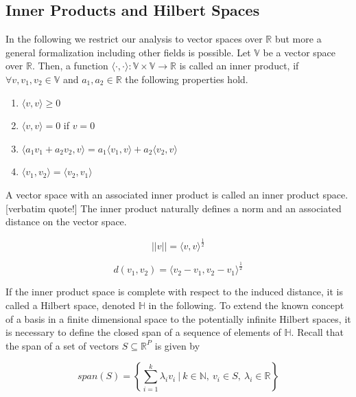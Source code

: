 \documentclass[11pt,twoside,a4paper]{article}
\begin{document}
	\subsection{Inner Products and Hilbert Spaces}
	In the following we restrict our analysis to vector spaces over $\mathbb{R}$ but more a general formalization including other fields is possible. Let $\mathbb{V}$ be a vector space over $\mathbb{R}$.  Then, a function $\langle \cdot, \cdot \rangle : \mathbb{V} \times  \mathbb{V} \rightarrow \mathbb{R}$ is called an inner product, if $\forall v, v_1, v_2 \in \mathbb{V}$ and $a_1, a_2 \in \mathbb{R}$ the following properties hold.
	
	\begin{multicols}{2}
		\begin{enumerate}
			\item $\langle v, v \rangle \geq 0$
			\item $\langle v, v \rangle = 0$ if $v = 0$
			\item $\langle a_1 v_1 + a_2 v_2, v \rangle = a_1 \langle v_1, v \rangle + a_2 \langle v_2, v \rangle$
			\item $\langle v_1, v_2 \rangle = \langle v_2, v_1 \rangle$
		\end{enumerate}
	\end{multicols}

	A vector space with an associated inner product is called an inner product space. {\color{red}[verbatim quote!]}
	The inner product naturally defines a norm and an associated distance on the vector space.
	
	\begin{equation}
		\lvert \lvert v \rvert \rvert = {\langle v, v \rangle}^{\frac{1}{2}}
	\end{equation}

	\begin{equation}
		d(v_1, v_2) = {\langle v_2 - v_1, v_2 - v_1 \rangle}^{\frac{1}{2}}
	\end{equation}
	
	If the inner product space is complete with respect to the induced distance, it is called a Hilbert space, denoted $\mathbb{H}$ in the following. To extend the known concept of a basis in a finite dimensional space to the potentially infinite Hilbert spaces, it is necessary to define the closed span of a sequence of elements of $\mathbb{H}$. Recall that the span of a set of vectors $S \subseteq \mathbb{R}^P$ is given by
	
	\begin{equation}
		span(S) = \left\{\sum_{i = 1}^{k} \lambda_i v_i \: \bigg\vert \: k \in \mathbb{N}, \: v_i \in S, \: \lambda_i \in \mathbb{R} \right\}
	\end{equation}
			
\end{document}
